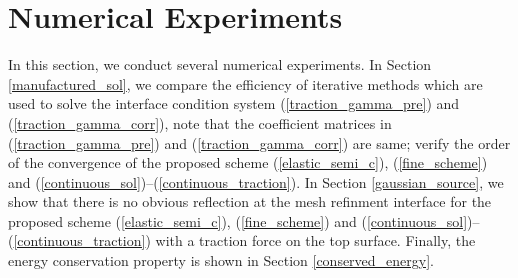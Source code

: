 \section{Numerical Experiments}
In this section, we conduct several numerical experiments. In Section \ref{manufactured_sol}, we compare the efficiency of iterative methods which are used to solve the interface condition system (\ref{traction_gamma_pre}) and (\ref{traction_gamma_corr}), note that the coefficient matrices in (\ref{traction_gamma_pre}) and (\ref{traction_gamma_corr}) are same; verify the order of the convergence of the proposed scheme (\ref{elastic_semi_c}), (\ref{fine_scheme}) and (\ref{continuous_sol})--(\ref{continuous_traction}). In Section \ref{gaussian_source}, we show that there is no obvious reflection at the mesh refinment interface for the proposed scheme (\ref{elastic_semi_c}), (\ref{fine_scheme}) and (\ref{continuous_sol})--(\ref{continuous_traction}) with a traction force on the top surface. Finally, the energy conservation property is shown in Section \ref{conserved_energy}.